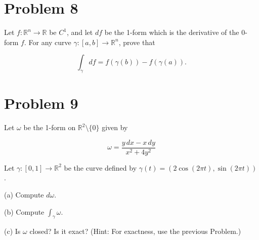 \documentclass[11pt]{article}
\begin{document}
\newpage

\section*{Problem 8}

Let $f : \mathbb{R}^n \to \mathbb{R}$ be $C^1$, and let $df$ be the 1-form which is the derivative of the 0-form $f$. For any curve $\gamma : [a, b] \to \mathbb{R}^n$, prove that

\[
\int_{\gamma} df = f(\gamma(b)) - f(\gamma(a)).
\]

\newpage

\section*{Problem 9}

Let $\omega$ be the 1-form on $\mathbb{R}^2 \setminus \{0\}$ given by

\[
\omega = \frac{y \, dx - x \, dy}{x^2 + 4y^2}
\]

Let $\gamma : [0, 1] \to \mathbb{R}^2$ be the curve defined by $\gamma(t) = (2 \cos(2\pi t), \sin(2\pi t))$.

(a) Compute $d\omega$.

(b) Compute $\int_{\gamma} \omega$.

(c) Is $\omega$ closed? Is it exact? (Hint: For exactness, use the previous Problem.)
\end{document}
